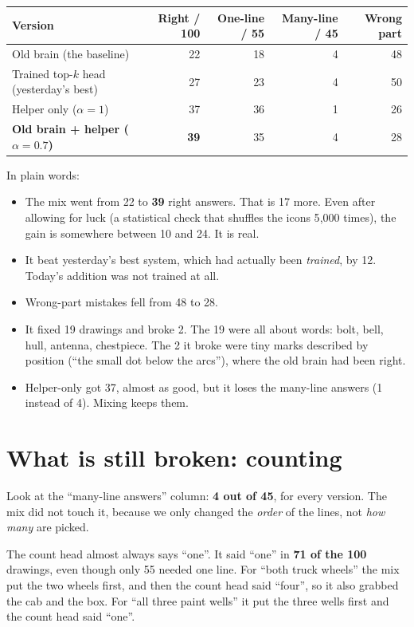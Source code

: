 \documentclass[11pt,a4paper]{article}
\begin{document}
\begin{center}
\small
\begin{tabular}{@{}lrrrr@{}}
\toprule
Version & Right / 100 & One-line / 55 & Many-line / 45 & Wrong part \\
\midrule
Old brain (the baseline) & 22 & 18 & 4 & 48 \\
Trained top-$k$ head (yesterday's best) & 27 & 23 & 4 & 50 \\
Helper only ($\alpha = 1$) & 37 & 36 & 1 & 26 \\
\textbf{Old brain + helper ($\alpha = 0.7$)} & \textbf{39} & 35 & 4 & 28 \\
\bottomrule
\end{tabular}
\end{center}

In plain words:
\begin{itemize}[leftmargin=1.6em]
  \item The mix went from 22 to \textbf{39} right answers. That is 17 more. Even after allowing for luck (a statistical check that shuffles the icons 5{,}000 times), the gain is somewhere between 10 and 24. It is real.
  \item It beat yesterday's best system, which had actually been \emph{trained}, by 12. Today's addition was not trained at all.
  \item Wrong-part mistakes fell from 48 to 28.
  \item It fixed 19 drawings and broke 2. The 19 were all about words: bolt, bell, hull, antenna, chestpiece. The 2 it broke were tiny marks described by position (``the small dot below the arcs''), where the old brain had been right.
  \item Helper-only got 37, almost as good, but it loses the many-line answers (1 instead of 4). Mixing keeps them.
\end{itemize}

\section*{What is still broken: counting}

Look at the ``many-line answers'' column: \textbf{4 out of 45}, for every version.
The mix did not touch it, because we only changed the \emph{order} of the lines, not \emph{how many} are picked.

The count head almost always says ``one''. It said ``one'' in \textbf{71 of the 100} drawings, even though only 55 needed one line.
For ``both truck wheels'' the mix put the two wheels first, and then the count head said ``four'', so it also grabbed the cab and the box.
For ``all three paint wells'' it put the three wells first and the count head said ``one''.
\end{document}
